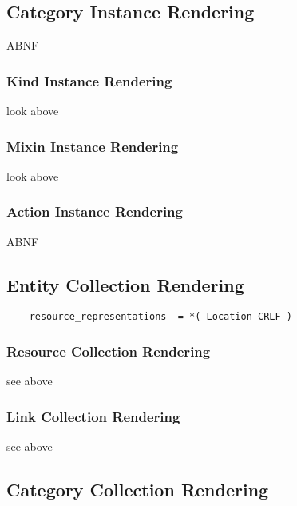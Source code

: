 \documentclass[10pt,a4paper]{article}
\begin{document}

\subsection{Category Instance Rendering}
\label{sec:format_category_instance_rendering}

ABNF

\subsubsection{Kind Instance Rendering}
\label{sec:format_kind}

 look above

\subsubsection{Mixin Instance Rendering}
\label{sec:format_mixin}

look above

\subsubsection{Action Instance Rendering}
\label{sec:format_action}

ABNF

\subsection{Entity Collection Rendering}

\begin{verbatim}
	resource_representations  = *( Location CRLF ) 
\end{verbatim}

\subsubsection{Resource Collection Rendering}

see above

\subsubsection{Link Collection Rendering}

see above

\subsection{Category Collection Rendering}
\end{document}
